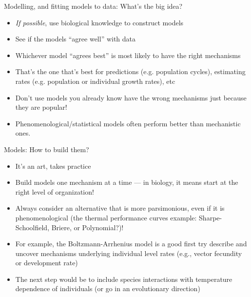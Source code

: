 \documentclass[xcolor=x11names,compress]{beamer}
\renewcommand{\(}{\begin{columns}}
\renewcommand{\)}{\end{columns}}
\newcommand{\<}[1]{\begin{column}{#1}}
\renewcommand{\>}{\end{column}}
\begin{document}
\begin{frame}{Modelling, and fitting models to data: What's the big idea?}

\begin{itemize} [<+->] \itemsep8pt

	\item {\it If possible}, use biological knowledge to construct models
	\item See if the models ``agree well'' with data
	\item Whichever model ``agrees best'' is most likely to have the right 
	mechanisms
	\item That's the one that's best for predictions (e.g. population 
	cycles), estimating rates (e.g. population or individual growth rates), etc
	\item Don't use models you already know have the wrong mechanisms just because they are popular!
	\item Phenomenological/statistical models often perform better than mechanistic ones.    

\end{itemize}
  
\end{frame}


\begin{frame}{Models: How to build them?}

\begin{itemize}\itemsep10pt

	\item It's an art, takes practice 
	\item Build models one mechanism at a time --- in biology, it means 
	start at the right level of organization! 
	\item Always consider an alternative that is more parsimonious, even if 
	it is phenomenological (the thermal performance curves example: Sharpe-Schoolfield, Briere, or Polynomial?)! 

	\item For example, the Boltzmann-Arrhenius model is a good first try 
	describe and uncover mechanisms underlying individual level rates (e.g., vector fecundity or development rate)  

	\item The next step would be to include species interactions with  
	temperature dependence of individuals (or go in an evolutionary direction)

\end{itemize}   

\end{frame}
\end{document}
